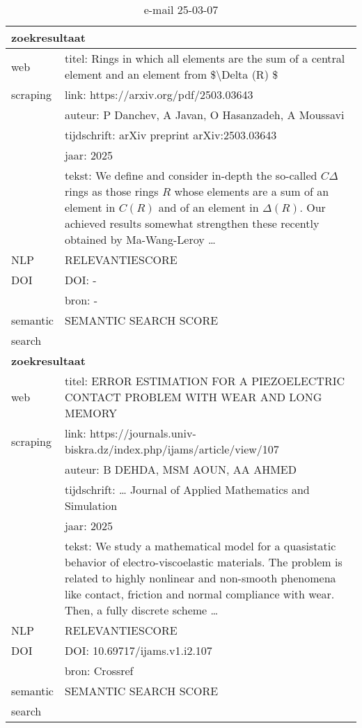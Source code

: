 \begin{table}[h!]
    \caption{e-mail 25-03-07}
    \centering
    \begin{tabularx}{\textwidth}{|p{4cm}|X|} 
        \hline
        \multicolumn{2}{|X|}{\textbf{zoekresultaat}} \\
        \hline
        web &titel: Rings in which all elements are the sum of a central element and an element from \$\textbackslash Delta (R) \$\\
        scraping&link: https://arxiv.org/pdf/2503.03643\\
        &auteur: P Danchev, A Javan, O Hasanzadeh, A Moussavi\\
        &tijdschrift: arXiv preprint arXiv:2503.03643\\
        &jaar: 2025\\
        &tekst: We define and consider in-depth the so-called $C\Delta$ rings as those rings $R$ whose elements are a sum of an element in $C(R)$ and of an element in $\Delta(R)$. Our achieved results somewhat strengthen these recently obtained by Ma-Wang-Leroy …\\
        \hline
        NLP&RELEVANTIESCORE\\
        \hline
        DOI&DOI: -\\
        &bron: -\\
        \hline
        semantic&SEMANTIC SEARCH SCORE\\
        search&\\
        \hline
        \multicolumn{2}{|X|}{\textbf{zoekresultaat}} \\
        \hline
        web &titel: ERROR ESTIMATION FOR A PIEZOELECTRIC CONTACT PROBLEM WITH WEAR AND LONG MEMORY\\
        scraping&link: https://journals.univ-biskra.dz/index.php/ijams/article/view/107\\
        &auteur: B DEHDA, MSM AOUN, AA AHMED\\
        &tijdschrift: … Journal of Applied Mathematics and Simulation\\
        &jaar: 2025\\
        &tekst: We study a mathematical model for a quasistatic behavior of electro-viscoelastic materials. The problem is related to highly nonlinear and non-smooth phenomena like contact, friction and normal compliance with wear. Then, a fully discrete scheme …\\
        \hline
        NLP&RELEVANTIESCORE\\
        \hline
        DOI&DOI: 10.69717/ijams.v1.i2.107\\
        &bron: Crossref\\
        \hline
        semantic&SEMANTIC SEARCH SCORE\\
        search&\\
        \hline
    \end{tabularx}
    \label{table:email20250307}
\end{table}
